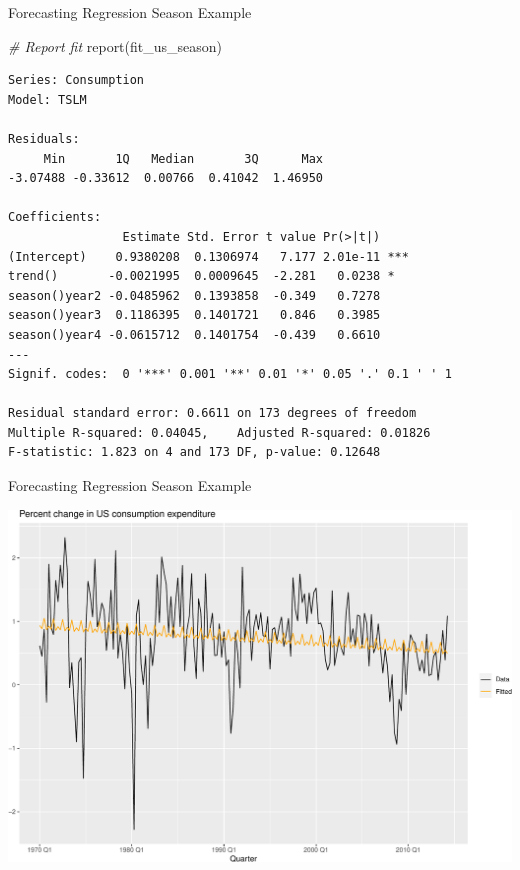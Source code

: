 \documentclass[
  ignorenonframetext,
]{beamer}
\newenvironment{Shaded}{\begin{snugshade}}{\end{snugshade}}
\newcommand{\CommentTok}[1]{\textcolor[rgb]{0.56,0.35,0.01}{\textit{#1}}}
\newcommand{\FunctionTok}[1]{\textcolor[rgb]{0.00,0.00,0.00}{#1}}
\newcommand{\NormalTok}[1]{#1}
\begin{document}
\begin{frame}[fragile]{Forecasting \textbar{} \small Regression Season
Example}
\protect\hypertarget{forecasting-regression-season-example-1}{}
\tiny

\normalfont

\tiny

\begin{Shaded}
\begin{Highlighting}[]
\CommentTok{\# Report fit}
\FunctionTok{report}\NormalTok{(fit\_us\_season)}
\end{Highlighting}
\end{Shaded}

\begin{verbatim}
Series: Consumption 
Model: TSLM 

Residuals:
     Min       1Q   Median       3Q      Max 
-3.07488 -0.33612  0.00766  0.41042  1.46950 

Coefficients:
                Estimate Std. Error t value Pr(>|t|)    
(Intercept)    0.9380208  0.1306974   7.177 2.01e-11 ***
trend()       -0.0021995  0.0009645  -2.281   0.0238 *  
season()year2 -0.0485962  0.1393858  -0.349   0.7278    
season()year3  0.1186395  0.1401721   0.846   0.3985    
season()year4 -0.0615712  0.1401754  -0.439   0.6610    
---
Signif. codes:  0 '***' 0.001 '**' 0.01 '*' 0.05 '.' 0.1 ' ' 1

Residual standard error: 0.6611 on 173 degrees of freedom
Multiple R-squared: 0.04045,    Adjusted R-squared: 0.01826
F-statistic: 1.823 on 4 and 173 DF, p-value: 0.12648
\end{verbatim}

\normalfont
\end{frame}

\begin{frame}{Forecasting \textbar{} \small Regression Season Example}
\protect\hypertarget{forecasting-regression-season-example-2}{}
\tiny

\includegraphics{Time-series-regression-models_files/figure-beamer/unnamed-chunk-40-1.pdf}

\normalfont
\end{frame}
\end{document}
